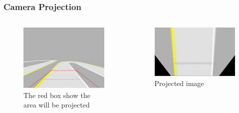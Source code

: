 \begin{frame}
	\frametitle{Camera Projection}
	\begin{columns}
	\begin{column}{0.5\textwidth}
	\begin{figure}
		\includegraphics[width=\textwidth]{figures/png/calibprojection}
		\caption{The red box show the area will be projected}
	\end{figure}
	\end{column}
	\begin{column}{0.5\textwidth}
	\begin{figure}
		\includegraphics[width=\textwidth]{figures/png/projected}
		\caption{Projected image}
	\end{figure}
	\end{column}
	\end{columns}
\end{frame}

